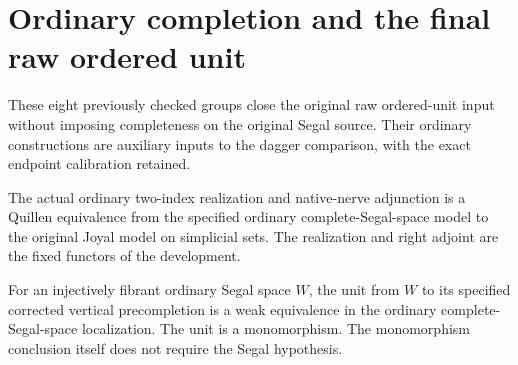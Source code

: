 \section{Ordinary completion and the final raw ordered unit}

These eight previously checked groups close the original raw ordered-unit input without imposing completeness on the original Segal source. Their ordinary constructions are auxiliary inputs to the dagger comparison, with the exact endpoint calibration retained.

\begin{resultblock}
\begin{proposition}
\label{catalogue:C1}
The actual ordinary two-index realization and native-nerve adjunction is a
Quillen equivalence from the specified ordinary complete-Segal-space model
to the original Joyal model on simplicial sets.
The realization and right adjoint are the fixed functors of the development.
\end{proposition}

\end{resultblock}

\begin{resultblock}
\begin{proposition}
\label{catalogue:C2}
For an injectively fibrant ordinary Segal space $W$,
the unit from $W$ to its specified corrected vertical precompletion is a weak
equivalence in the ordinary complete-Segal-space localization.
The unit is a monomorphism.
The monomorphism conclusion itself does not require the Segal hypothesis.
\end{proposition}

\end{resultblock}

